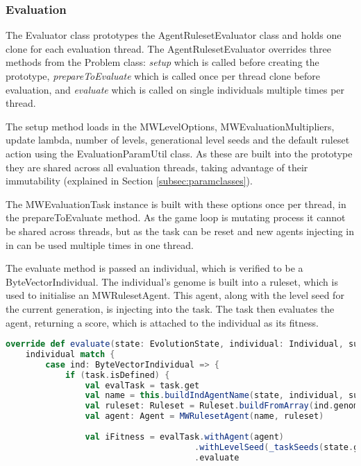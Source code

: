 \subsubsection{Evaluation}

The Evaluator class prototypes the AgentRulesetEvaluator class and holds one clone for each evaluation thread. The AgentRulesetEvaluator overrides three methods from the Problem class: \emph{setup} which is called before creating the prototype, \emph{prepareToEvaluate} which is called once per thread clone before evaluation, and \emph{evaluate} which is called on single individuals multiple times per thread.

The setup method loads in the MWLevelOptions, MWEvaluationMultipliers, update lambda, number of levels, generational level seeds and the default ruleset action using the EvaluationParamUtil class. As these are built into the prototype they are shared across all evaluation threads, taking advantage of their immutability (explained in Section \ref{subsec:paramclasses}). 

The MWEvaluationTask instance is built with these options once per thread, in the prepareToEvaluate method. As the game loop is mutating process it cannot be shared across threads, but as the task can be reset and new agents injecting in in can be used multiple times in one thread.

The evaluate method is passed an individual, which is verified to be a ByteVectorIndividual. The individual's genome is built into a ruleset, which is used to initialise an MWRulesetAgent. This agent, along with the level seed for the current generation, is injecting into the task. The task then evaluates the agent, returning a score, which is attached to the individual as its fitness.


\begin{minipage}{0.9\linewidth}
\centering
\begin{lstlisting}[language=scala]
override def evaluate(state: EvolutionState, individual: Individual, subpop: Int, thread: Int): Unit = {
    individual match {
        case ind: ByteVectorIndividual => {
            if (task.isDefined) {
                val evalTask = task.get
                val name = this.buildIndAgentName(state, individual, subpop, thread)
                val ruleset: Ruleset = Ruleset.buildFromArray(ind.genome, defaultAction)
                val agent: Agent = MWRulesetAgent(name, ruleset)
            
                val iFitness = evalTask.withAgent(agent)
                                      .withLevelSeed(_taskSeeds(state.generation))
                                      .evaluate
\end{lstlisting}
\end{minipage}


